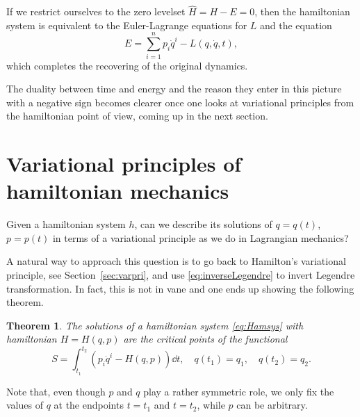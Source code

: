 \documentclass[english,fontsize=11pt,paper=b5]{scrbook}
\newtheorem{theorem}{Theorem}[chapter]
\theoremstyle{definition}
\begin{document}
    If we restrict ourselves to the zero levelset $\hat H = H - E = 0$, then the hamiltonian system is equivalent to the Euler-Lagrange equations for $L$ and the equation
    \begin{equation}
      E = \sum_{i=1}^n p_i \dot q^i - L(q, \dot q, t),
    \end{equation}
    which completes the recovering of the original dynamics.

    The duality between time and energy and the reason they enter in this picture with a negative sign becomes clearer once one looks at variational principles from the hamiltonian point of view, coming up in the next section.

    \section{Variational principles of hamiltonian mechanics}

    Given a hamiltonian system $h$, can we describe its solutions of $q=q(t)$, $p=p(t)$ in terms of a variational principle as we do in Lagrangian mechanics?

    A natural way to approach this question is to go back to Hamilton's variational principle, see Section~\ref{sec:varpri}, and use \eqref{eq:inverseLegendre} to invert Legendre transformation.
    In fact, this is not in vane and one ends up showing the following theorem.

    \begin{theorem}\label{thm:variationalHamilton}
      The solutions of a hamiltonian system \eqref{eq:Hamsys} with hamiltonian $H=H(q,p)$ are the critical points of the functional
      \begin{equation}\label{eq:variationalHamilton}
        S = \int_{t_1}^{t_2} \left(p_i\dot q^i - H(q,p)\right) \dd t,
        \quad q(t_1) = q_1, \quad q(t_2) = q_2.
      \end{equation}
    \end{theorem}
    Note that, even though $p$ and $q$ play a rather symmetric role, we only fix the values of $q$ at the endpoints $t=t_1$ and $t=t_2$, while $p$ can be arbitrary.
\end{document}
